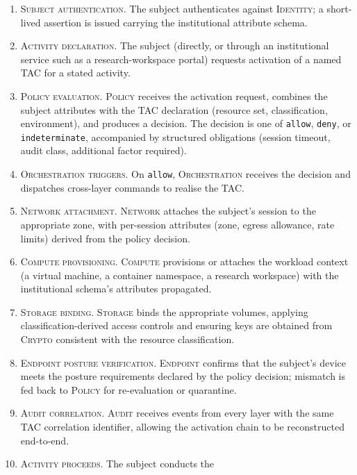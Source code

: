 \begin{enumerate}[leftmargin=2em,nosep,label=\arabic*.]
  \item \textsc{Subject authentication.} The subject authenticates
    against \textsc{Identity}; a short-lived assertion is issued
    carrying the institutional attribute schema.
  \item \textsc{Activity declaration.} The subject (directly, or
    through an institutional service such as a research-workspace
    portal) requests activation of a named TAC for a stated
    activity.
  \item \textsc{Policy evaluation.} \textsc{Policy} receives the
    activation request, combines the subject attributes with the
    TAC declaration (resource set, classification, environment),
    and produces a decision. The decision is one of \texttt{allow},
    \texttt{deny}, or \texttt{indeterminate}, accompanied by
    structured obligations (session timeout, audit class,
    additional factor required).
  \item \textsc{Orchestration triggers.} On \texttt{allow},
    \textsc{Orchestration} receives the decision and dispatches
    cross-layer commands to realise the TAC.
  \item \textsc{Network attachment.} \textsc{Network} attaches
    the subject's session to the appropriate zone, with
    per-session attributes (zone, egress allowance, rate limits)
    derived from the policy decision.
  \item \textsc{Compute provisioning.} \textsc{Compute}
    provisions or attaches the workload context (a virtual
    machine, a container namespace, a research workspace) with
    the institutional schema's attributes propagated.
  \item \textsc{Storage binding.} \textsc{Storage} binds the
    appropriate volumes, applying classification-derived access
    controls and ensuring keys are obtained from
    \textsc{Crypto} consistent with the resource classification.
  \item \textsc{Endpoint posture verification.} \textsc{Endpoint}
    confirms that the subject's device meets the posture
    requirements declared by the policy decision; mismatch is
    fed back to \textsc{Policy} for re-evaluation or
    quarantine.
  \item \textsc{Audit correlation.} \textsc{Audit} receives
    events from every layer with the same TAC correlation
    identifier, allowing the activation chain to be reconstructed
    end-to-end.
  \item \textsc{Activity proceeds.} The subject conducts the

\end{enumerate}

